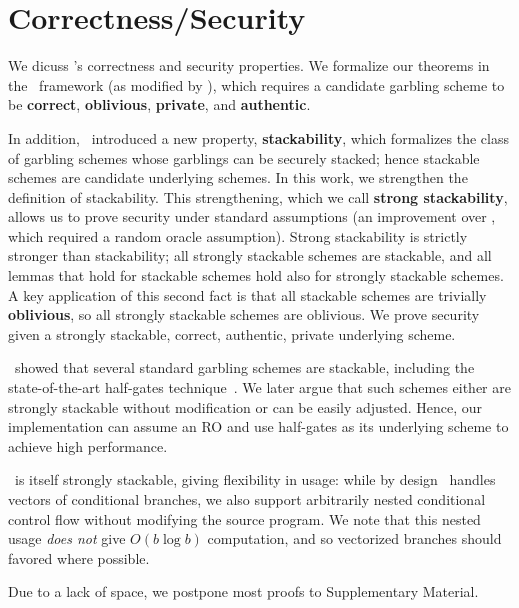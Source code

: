 \section{\ourschemelong Correctness/Security}\label{sec:proof}

We dicuss \ourschemelong's correctness and security properties.
We formalize our theorems in the~\cite{CCS:BelHoaRog12} framework (as
modified by \HK),
which requires a candidate garbling scheme to be \textbf{correct},
\textbf{oblivious}, \textbf{private}, and \textbf{authentic}.

In addition, \HK\ introduced a new property, \textbf{stackability}, which
formalizes the class of garbling schemes whose garblings can be
securely stacked; hence stackable schemes are candidate underlying
schemes.
%
In this work, we strengthen the definition of stackability.  This
strengthening, which we call \textbf{strong stackability}, allows us to
prove security under standard assumptions (an improvement over \HK,
which required a random oracle assumption).
Strong stackability is strictly stronger than stackability; all
strongly
stackable schemes are stackable,
and all lemmas that hold for stackable schemes hold also for strongly
stackable schemes.
A key application of this second fact is that all stackable schemes
are trivially \textbf{oblivious}, so all strongly stackable schemes are
oblivious.
We prove security given a strongly stackable, correct, authentic,
private underlying scheme.

\HK\ showed that several standard garbling schemes are stackable, including
the state-of-the-art half-gates technique~\cite{EC:ZahRosEva15}.
We later argue that such schemes either are strongly stackable without
modification or can be easily adjusted.
Hence, our implementation can assume an RO and use half-gates as its underlying
scheme to achieve high performance.

\ourschemelong\ is itself strongly stackable, giving
flexibility in usage: while by design \ourschemelong\ handles vectors
of conditional branches, we also support arbitrarily nested
conditional control flow without modifying the source program.
%
We note that this nested usage \emph{does not} give $O(b\log b)$
computation, and so vectorized branches should favored where possible.

Due to a lack of space, we postpone most proofs to Supplementary
Material.



